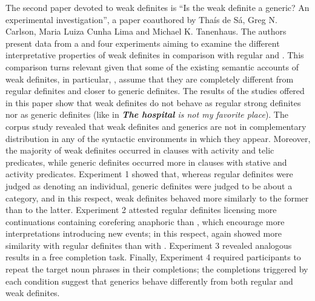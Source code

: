 \documentclass[output=paper]{langsci/langscibook}
\begin{document}
The second paper devoted to weak definites is “Is the weak definite a generic? An experimental investigation”, a paper coauthored by Thaís de Sá, Greg N. Carlson, Maria Luiza Cunha Lima and Michael K. Tanenhaus. The authors present data from a  and four experiments aiming to examine the different interpretative properties of weak definites in comparison with regular and . This comparison turns relevant given that some of the existing semantic accounts of weak definites, in particular, \citet{Aguilar-GuevaraZwarsts2011,Aguilar-GuevaraZwarts2013}, assume that they are completely different from regular definites and closer to generic definites. The results of the studies offered in this paper show that weak definites do not behave as regular strong definites nor as generic definites (like in \textit{\textbf{The hospital} is not my favorite place}). The corpus study revealed that weak definites and generics are not in complementary distribution in any of the syntactic environments in which they appear. Moreover, the majority of weak definites occurred in clauses with activity and telic predicates, while generic definites occurred more in clauses with stative and activity predicates. Experiment 1 showed that, whereas regular definites were judged as denoting an individual, generic definites were judged to be about a category, and in this respect, weak definites behaved more similarly to the former than to the latter. Experiment 2 attested regular definites licensing more continuations containing corefering anaphoric  than , which encourage more interpretations introducing new events; in this respect,  again showed more similarity with regular definites than with . Experiment 3 revealed analogous results in a free completion task. Finally, Experiment 4 required participants to repeat the target noun phrases in their completions; the completions triggered by each condition suggest that generics behave differently from both regular and weak definites.
\end{document}
